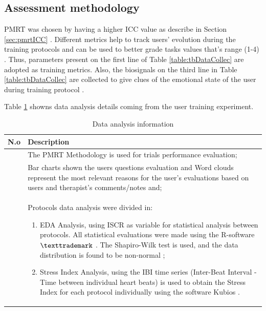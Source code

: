 \subsection{Assessment methodology}
\label{sec:assessmethod}

PMRT  was chosen by having a higher ICC value as describe in Section \ref{sec:pmrtICC} \cite{kamaraj2016}.  Different metrics help to track users' evolution during the training protocols and can be used to better grade tasks values that's range (1-4)  \cite{massengale2005}. Thus, parameters present on the first line of Table \ref{table:tbDataCollec} are adopted as training metrics. Also, the biosignals on the third line in Table \ref{table:tbDataCollec} are collected to give clues of the emotional state of the user during training protocol \cite{affanni2018}.

Table  \ref{table:tbDataAnaly} showns data analysis details coming from the user training experiment.

\begin{table}[!hbt]
\caption{Data analysis information}\label{table:tbDataAnaly}
\centering
\begin{tabular}{ >{\centering}m{0.5cm}  >{}m{14.5cm} }
\toprule
N.o &  Description \\
\midrule
1  	& The PMRT Methodology is used for trials performance evaluation;  \\ \midrule
2 	& Bar charts shown the users questions evaluation and Word clouds \cite{bletzer2015} represent the most relevant reasons for the user’s evaluations based on users and therapist’s comments/notes and; \\ \midrule
3 	& Protocols data analysis were divided in:
\begin{enumerate}
\item EDA Analysis, using ISCR as variable for statistical analysis between protocols. All statistical evaluations were made using the R-software$\texttrademark$ \cite{jurevckova2019}. The Shapiro-Wilk test is used, and the data distribution is found to be non-normal \cite{islam2019};
\item Stress Index Analysis, using the IBI time series (Inter-Beat Interval - Time between individual heart beats) is used to obtain the Stress Index for each protocol individually using the software Kubios \cite{hrvKubios2018}.
\end{enumerate} \\
\bottomrule
\end{tabular}
\end{table}


